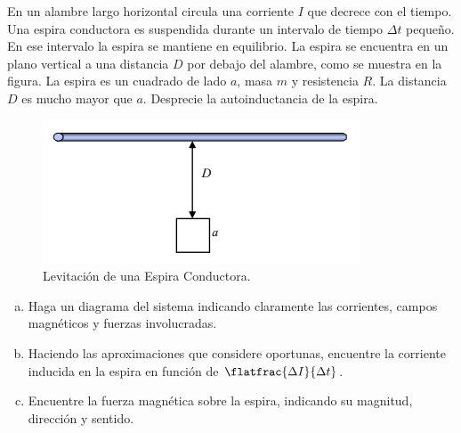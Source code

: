 \begin{mdframed}[style=warning]
	\begin{ejercicio}
		En un alambre largo horizontal circula una corriente $I$ que decrece con el tiempo. Una espira conductora es suspendida durante un intervalo de tiempo $\Delta t$ pequeño. En ese intervalo la espira se mantiene en equilibrio. La espira se encuentra en un plano vertical a una distancia $D$ por debajo del alambre, como se muestra en la figura. La espira es un cuadrado de lado $a$, masa $m$ y resistencia $R$. La distancia $D$ es mucho mayor que $a$. Desprecie la autoinductancia de la espira.
		\begin{figure}[H]
			\centering
			\includegraphics[scale=0.5]{./img/square.png}
			\caption{Levitación de una Espira Conductora.}
			\label{DF}	
		\end{figure}
		\begin{enumerate}[a)]
			\item Haga un diagrama del sistema indicando claramente las corrientes, campos magnéticos y fuerzas involucradas.
			\item Haciendo las aproximaciones que considere oportunas, encuentre la corriente inducida en la espira en función de $\flatfrac{\Delta I}{\Delta t}$.
			\item Encuentre la fuerza magnética sobre la espira, indicando su magnitud, dirección y sentido.
		\end{enumerate}
	\end{ejercicio}
\end{mdframed}
























